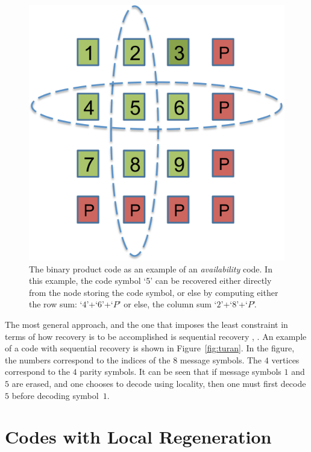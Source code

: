 \begin{multicols}{2}
\begin{figure}[H]
\centering
\includegraphics[scale=0.85]{src/Figures/chap4/product_code.jpg}  
\caption{The binary product code as an example of an {\em availability} code.  In this example, the code symbol `5' can be recovered either directly from the node storing the code symbol, or else by computing either the row sum: `$4$'+`$6$'+`$P$' or else, the column sum `$2$'+`$8$'+`$P$'.  }  \label{fig:product_code}    
\end{figure}
\vskip -0.5cm

The most general approach, and the one that imposes the least constraint in terms of how recovery is to be accomplished is sequential recovery \cite{PraLalKum}, \cite{BalKinKum_ISIT}.  An example of a code with sequential recovery is shown in Figure~\ref{fig:turan}. In the figure, the numbers correspond to the indices of the $8$ message symbols.  The $4$ vertices correspond to the $4$ parity symbols.  It can be seen that if message symbols $1$ and $5$ are erased, and one chooses to decode using locality, then one must first decode $5$ before decoding symbol~$1$.\\[-15pt]
\vskip -1cm

\section{Codes with Local Regeneration}
\vskip -0.3cm


\end{multicols}
